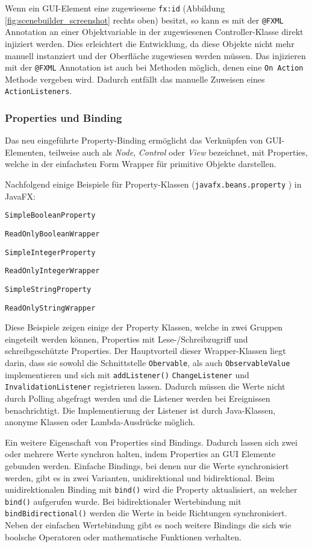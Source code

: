 Wenn ein \ac{GUI}-Element eine zugewiesene \texttt{fx:id} (Abbildung \ref{fig:scenebuilder_screenshot} rechts oben) besitzt, so kann es mit der \texttt{@FXML} Annotation an einer Objektvariable in der zugewiesenen Controller-Klasse direkt injiziert werden.
Dies erleichtert die Entwicklung, da diese Objekte nicht mehr manuell instanziert und der Oberfläche zugewiesen werden müssen.
Das injizieren mit der \texttt{@FXML} Annotation ist auch bei Methoden möglich, denen eine \texttt{On Action} Methode vergeben wird.
Dadurch entfällt das manuelle Zuweisen eines \texttt{ActionListeners}.

\subsubsection{Properties und Binding}
Das neu eingeführte Property-Binding ermöglicht das Verknüpfen von \ac{GUI}-Elementen, teilweise auch als \emph{Node}, \emph{Control} oder \emph{View} bezeichnet, mit Properties, welche in der einfachsten Form Wrapper für primitive Objekte darstellen.

Nachfolgend einige Beispiele für Property-Klassen (\texttt{javafx.beans.property} ) in JavaFX:
\begin{compactitem}
	\item \texttt{SimpleBooleanProperty}
	\item \texttt{ReadOnlyBooleanWrapper}
	\item \texttt{SimpleIntegerProperty}
	\item \texttt{ReadOnlyIntegerWrapper}
	\item \texttt{SimpleStringProperty}
	\item \texttt{ReadOnlyStringWrapper}
\end{compactitem}
Diese Beispiele zeigen einige der Property Klassen, welche in zwei Gruppen eingeteilt werden können, Properties mit Lese-/Schreibzugriff und schreibgeschützte Properties.
Der Hauptvorteil dieser Wrapper-Klassen liegt darin, dass sie sowohl die Schnittstelle \texttt{Obervable}, als auch \texttt{ObservableValue} implementieren und sich mit \texttt{addListener()} \texttt{ChangeListener} und \texttt{InvalidationListener} registrieren lassen.
Dadurch müssen die Werte nicht durch Polling abgefragt werden und die Listener werden bei Ereignissen benachrichtigt.
Die Implementierung der Listener ist durch Java-Klassen, anonyme Klassen oder Lambda-Ausdrücke möglich. \cite[Vgl.][75-79]{Dea.2014}

Ein weitere Eigenschaft von Properties sind Bindings.
Dadurch lassen sich zwei oder mehrere Werte synchron halten, indem Properties an \ac{GUI} Elemente gebunden werden.
Einfache Bindings, bei denen nur die Werte synchronisiert werden, gibt es in zwei Varianten, unidirektional und bidirektional. 
Beim unidirektionalen Binding mit \texttt{bind()} wird die Property aktualisiert, an welcher \texttt{bind()} aufgerufen wurde.
Bei bidirektionaler Wertebindung mit \texttt{bindBidirectional()} werden die Werte in beide Richtungen synchronisiert.
Neben der einfachen Wertebindung gibt es noch weitere Bindings die sich wie boolsche Operatoren oder mathematische Funktionen verhalten. \cite[Vgl.][79-81]{Dea.2014}

